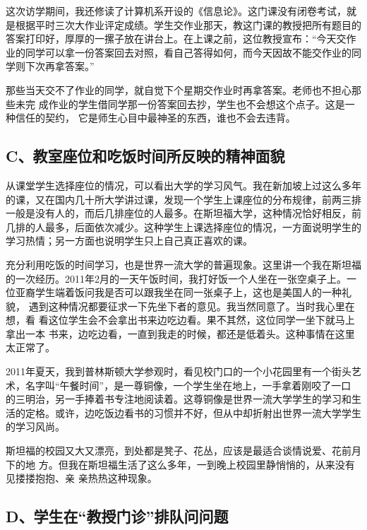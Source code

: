 \documentclass[11pt]{ctexart}
\begin{document}
{{{{这次访学期间，我还修读了计算机系开设的《信息论》。这门课没有闭卷考试，就
是根据平时三次大作业评定成绩。学生交作业那天，教这门课的教授把所有题目的
答案打印好，厚厚的一摞子放在讲台上。在上课之前，这位教授宣布：“今天交作
业的同学可以拿一份答案回去对照，看自己答得如何，而今天因故不能交作业的同
学则下次再拿答案。”


那些当天交不了作业的同学，就自觉下个星期交作业时再拿答案。老师也不担心那些未完
成作业的学生借同学那一份答案回去抄，学生也不会想这个点子。这是一种信任的契约，
它是师生心目中最神圣的东西，谁也不会去违背。




\subsection{C、教室座位和吃饭时间所反映的精神面貌}
\label{sec:org805583a}

从课堂学生选择座位的情况，可以看出大学的学习风气。我在新加坡上过这么多年
的课，又在国内几十所大学讲过课，发现一个学生上课座位的分布规律，前两三排
一般是没有人的，而后几排座位的人最多。在斯坦福大学，这种情况恰好相反，前
几排的人最多，后面依次减少。这种学生上课选择座位的情况，一方面说明学生的
学习热情；另一方面也说明学生只上自己真正喜欢的课。


充分利用吃饭的时间学习，也是世界一流大学的普遍现象。这里讲一个我在斯坦福
的一次经历。2011年2月的一天午饭时间，我打好饭一个人坐在一张空桌子上。一
位亚裔学生端着饭问我是否可以跟我坐在同一张桌子上，这也是美国人的一种礼貌，
遇到这种情况都要征求一下先坐下者的意见。我当然同意了。当时我心里在想，看
看这位学生会不会拿出书来边吃边看。果不其然，这位同学一坐下就马上拿出一本
书来，边吃边看，一直到我走的时候，都还是低着头。这种事情在这里太正常了。


2011年夏天，我到普林斯顿大学参观时，看见校门口的一个小花园里有一个街头艺
术，名字叫“午餐时间”，是一尊铜像，一个学生坐在地上，一手拿着刚咬了一口
的三明治，另一手捧着书专注地阅读着。这尊铜像是世界一流大学学生的学习和生
活的定格。或许，边吃饭边看书的习惯并不好，但从中却折射出世界一流大学学生
的学习风尚。


斯坦福的校园又大又漂亮，到处都是凳子、花丛，应该是最适合谈情说爱、花前月下的地
方。但我在斯坦福生活了这么多年，一到晚上校园里静悄悄的，从来没有见搂搂抱抱、亲
亲热热这种现象。




\subsection{D、学生在“教授门诊”排队问问题}
\label{sec:orge510b10}

}}}}
\end{document}
